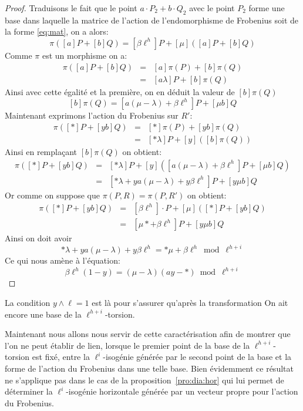 \documentclass[10pt,a4paper]{book}
\theoremstyle{plain}
\theoremstyle{definition}
\theoremstyle{definition}
\theoremstyle{definition}
\theoremstyle{definition}
\theoremstyle{remark}
\theoremstyle{remark}
\theoremstyle{definition}
\begin{document}
\begin{proof}
Traduisons le fait que le point $a \cdot P_2 + b \cdot Q_2$ avec le point $P_2$  forme une base dans laquelle la matrice de l'action de l'endomorphisme de Frobenius soit de la forme \ref{eq:mat}, on a alors:
\[
\pi([a]  P + [b]  Q) = [\beta \ell^h] P + [\mu] ([a] P + [b]  Q) 
\]
Comme $\pi$ est un morphisme on a: 
\begin{eqnarray*}
\pi([a]  P + [b]  Q) &=& [a]  \pi(P) + [b] \pi(Q) \\
					 &=& [a \lambda]  P + [b] \pi(Q)
\end{eqnarray*}
Ainsi avec cette égalité et la première, on en déduit la valeur de $ [b]\pi(Q)$
\[
[b] \pi (Q) = [a(\mu -\lambda) + \beta \ell^h]  P + [\mu b] Q
\]
Maintenant exprimons l'action du Frobenius sur $R'$:
\begin{eqnarray*}
\pi( [*] P + [yb] Q) &=& [*] \pi (P) + [ yb] \pi (Q) \\
&=&  [* \lambda ] P + [y]([b] \pi (Q)) 
\end{eqnarray*}
Ainsi en remplaçant  $[b]\pi (Q)$ on obtient: 
\begin{eqnarray*}
\pi( [*] P + [yb] Q) &=& [* \lambda ] P + [y] ( [a(\mu -\lambda) + \beta \ell^h]  P + [\mu b] Q) \\
&=& [*\lambda + y a (\mu - \lambda)+ y \beta \ell^h ] P + [y \mu b ] Q
\end{eqnarray*}
Or comme on suppose que $\pi(P,R)=\pi(P,R')$ on obtient:
\begin{eqnarray*}
\pi( [*] P + [yb] Q) &=&  [\beta \ell^h] \cdot P + [\mu] ([*] P + [yb] Q ) \\
&=& [\mu * + \beta \ell^h ] P + [y \mu b ] Q
\end{eqnarray*}
Ainsi on doit avoir 
\[
*\lambda + y a (\mu - \lambda)+ y \beta \ell^h  =* \mu + \beta \ell^h \bmod \ell^{h+i}
\]
Ce qui nous amène à l'équation: 
\[ \beta \ell^h (1-y) = (\mu - \lambda) (ay-*)  \bmod \ell^{h+i} \]
\end{proof}
La condition $y \wedge \ell=1$ est là pour s'assurer qu'après la transformation 
On ait encore une base de la $\ell^{h+i}$-torsion.


Maintenant nous allons nous servir de cette caractérisation afin de montrer que
l'on ne peut établir de lien, lorsque le premier point de la base de la 
$\ell^{h+i}$-torsion est fixé, entre la $\ell^i$-isogénie générée par le second
point de la base et la forme de l'action du Frobenius dans une telle base. Bien 
évidemment ce résultat ne s'applique pas dans le cas de la 
proposition~\ref{pro:dia:hor} qui lui permet de déterminer la $\ell^i$-isogénie
horizontale générée par un vecteur propre pour l'action du Frobenius.
\end{document}
